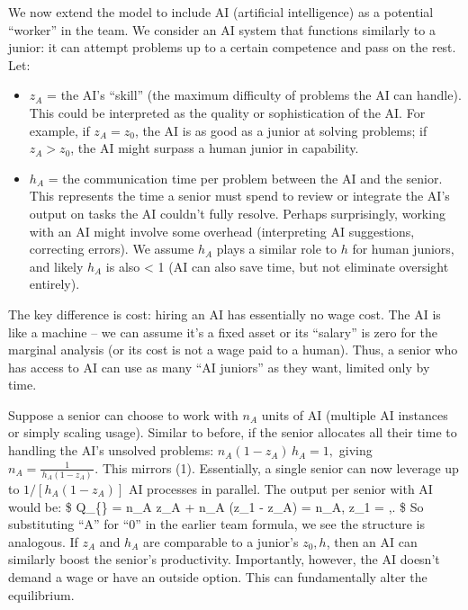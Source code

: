 \documentclass[12pt]{article}
\begin{document}
We now extend the model to include {AI (artificial intelligence)}
as a potential ``worker'' in the team. We consider an AI system that
functions similarly to a junior: it can attempt problems up to a certain
competence and pass on the rest. Let:

\begin{itemize}
\tightlist
\item
  \(z_A\) = the AI's ``skill'' (the maximum difficulty of problems the
  AI can handle). This could be interpreted as the quality or
  sophistication of the AI. For example, if \(z_A = z_0\), the AI is as
  good as a junior at solving problems; if \(z_A > z_0\), the AI might
  surpass a human junior in capability.
\item
  \(h_A\) = the communication time per problem between the AI and the
  senior. This represents the {time a senior must spend to review
  or integrate the AI's output on tasks the AI couldn't fully resolve}.
  Perhaps surprisingly, working with an AI might involve some overhead
  (interpreting AI suggestions, correcting errors). We assume \(h_A\)
  plays a similar role to \(h\) for human juniors, and likely \(h_A\) is
  also \textless{} 1 (AI can also save time, but not eliminate oversight
  entirely).
\end{itemize}

The key difference is {cost:} hiring an AI has essentially
{no wage cost}. The AI is like a machine -- we can assume it's a
fixed asset or its ``salary'' is zero for the marginal analysis (or its
cost is not a wage paid to a human). Thus, a senior who has access to AI
can use as many ``AI juniors'' as they want, limited only by time.

Suppose a senior can choose to work with {\(n_A\) units of AI}
(multiple AI instances or simply scaling usage). Similar to before, if
the senior allocates all their time to handling the AI's unsolved
problems: \(n_A (1 - z_A)\, h_A = 1,\) giving
\(n_A = \frac{1}{\,h_A(1-z_A)\,}.\) This mirrors (1). Essentially, a
single senior can now leverage up to \(1/[h_A(1-z_A)]\) AI processes in
parallel. The {output per senior with AI} would be: \$
Q\_\{\} = n\_A z\_A + n\_A (z\_1 - z\_A) =
n\_A, z\_1 = ,. \$ So substituting
``A'' for ``0'' in the earlier team formula, we see the structure is
analogous. If \(z_A\) and \(h_A\) are comparable to a junior's
\(z_0, h\), then an AI can similarly boost the senior's productivity.
{Importantly, however, the AI doesn't demand a wage or have an
outside option.} This can fundamentally alter the equilibrium.
\end{document}
